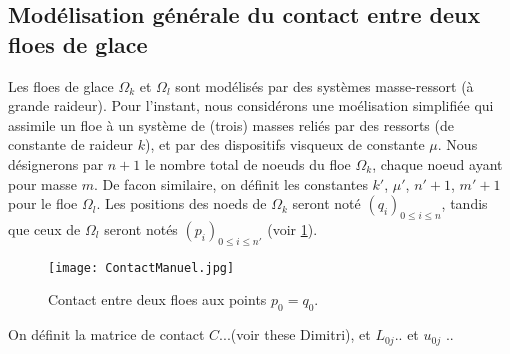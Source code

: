 \subsection{Modélisation générale du contact entre deux floes de glace}

Les floes de glace $\Omega_k$ et $\Omega_l$ sont modélisés par des systèmes masse-ressort (à grande raideur). Pour l'instant, nous considérons une moélisation simplifiée qui assimile un floe à un système de (trois) masses reliés par des ressorts (de constante de raideur $k$), et par des dispositifs visqueux de constante $\mu$.
Nous désignerons par $n+1$ le nombre total de noeuds du floe $\Omega_k$, chaque noeud ayant pour masse $m$. De facon similaire, on définit les constantes $k'$, $\mu'$, $n'+1$, $m'+1$ pour le floe $\Omega_l$. Les positions des noeds de $\Omega_k$ seront noté $(q_i)_{0\leq i\leq n}$, tandis que ceux de $\Omega_l$ seront notés $(p_i)_{0 \leq i\leq n'}$ (voir \cref{fig:contactmanuel}). 

\begin{figure}[!h]
    \centering
    \texttt{[image: ContactManuel.jpg]}
    \caption{Contact entre deux floes aux points $p_0 = q_0$.}
    \label{fig:contactmanuel}
\end{figure}

\noindent On définit la matrice de contact $C$...(voir these Dimitri), et $L_{0j}$.. et $u_{0j}$ ..

